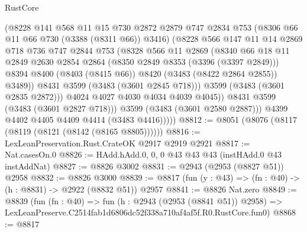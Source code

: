 \begin{lexlean}{RustCore}
\begin{coremodule}
                    (@8228
                      @141
                      @568
                      @11
                      @15
                      @730
                      @2872
                      @2879
                      @747
                      @2834
                      @753
                      (@8306 @66 @11 @66 @730 (@3388 (@8311 @66)) @3416)
                      (@8228
                        @566
                        @147
                        @11
                        @14
                        @2869
                        @718
                        @736
                        @747
                        @2844
                        @753
                        (@8328
                          @566
                          @11
                          @2869
                          (@8340
                            @66
                            @18
                            @11
                            @2849
                            @2630
                            @2854
                            @2864
                            (@8350 @2849 @8353 (@3396 (@3397 @2849)))
                            @8394
                            @8400
                            (@8403 (@8415 @66))
                            @8420
                            (@3483 (@8422 @2864 @2855))
                            @3489))
                        @8431
                        @3599
                        (@3483 (@3601 @2845 @718)))
                      @3599
                      (@3483 (@3601 @2835 @2872)))
                    @4024
                    @4027
                    @4030
                    @4034
                    @4039
                    @4045))
                @8431
                @3599
                (@3483 (@3601 @2827 @718)))
              @3599
              (@3483 (@3601 @2580 @2887)))
            @4399
            @4402
            @4405
            @4409
            @4414
            (@3483 @4416)))))
@8812 := @8051 (@8076 (@8117 (@8119 (@8121 (@8142 (@8165 @8805))))))
@8816 := LexLeanPreservation.Rust.CrateOK @2917 @2919 @2921
@8817 := Nat.casesOn.{0}
@8826 := HAdd.hAdd.{0, 0, 0} @43 @43 @43 (instHAdd.{0} @43 instAddNat)
@8827 := @8826 @3002
@8831 := @2943 (@2953 (@8827 @51)) @2958
@8832 := @8826 @3000
@8839 := @8817 (fun (y : @43) => (fn : @40) -> (h : @8831) -> @2922 (@8832 @51)) @2957
@8841 := @8826 Nat.zero
@8849 := @8839
    (fun (fn : @40) =>
    fun (h : @2943 (@2953 (@8841 @51)) @2958) =>
    LexLeanPreserve.C2514fab1d6806dc52f338a710af4af5f.R0.RustCore.fun0)
@8868 := @8817

\end{coremodule}
\end{lexlean}

